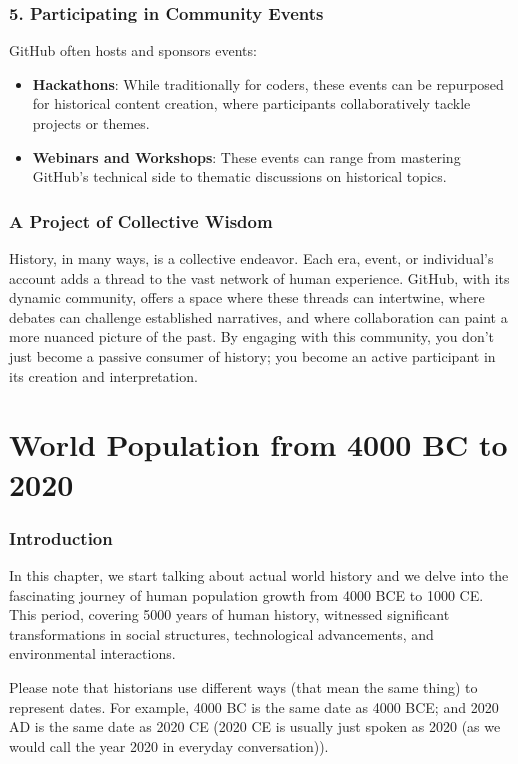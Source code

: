 \documentclass[a4paper,12pt]{book}
\begin{document}
\subsection*{5. Participating in Community Events}
GitHub often hosts and sponsors events:

\begin{itemize}
    \item \textbf{Hackathons}: While traditionally for coders, these events can be repurposed for historical content creation, where participants collaboratively tackle projects or themes.
    \item \textbf{Webinars and Workshops}: These events can range from mastering GitHub's technical side to thematic discussions on historical topics.
\end{itemize}

\subsection*{A Project of Collective Wisdom}
History, in many ways, is a collective endeavor. Each era, event, or individual's account adds a thread to the vast network of human experience. GitHub, with its dynamic community, offers a space where these threads can intertwine, where debates can challenge established narratives, and where collaboration can paint a more nuanced picture of the past. By engaging with this community, you don't just become a passive consumer of history; you become an active participant in its creation and interpretation.

\chapter{World Population from 4000 BC to 2020}
\subsection*{Introduction}
In this chapter, we start talking about actual world history and we delve into the fascinating journey of human population growth from 4000 BCE to 1000 CE. This period, covering 5000 years of human history, witnessed significant transformations in social structures, technological advancements, and environmental interactions. 

Please note that historians use different ways (that mean the same thing) to represent dates. For example, 4000 BC is the same date as 4000 BCE; and 2020 AD is the same date as 2020 CE (2020 CE is usually just spoken as 2020 (as we would call the year 2020 in everyday conversation)).
\end{document}
